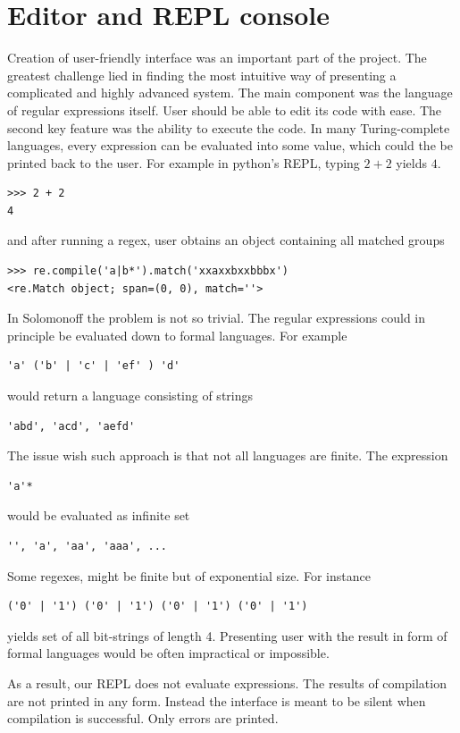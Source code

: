 
\section{Editor and REPL console}

Creation of user-friendly interface was an important part of the project.
The greatest challenge lied in finding the most intuitive way of presenting a complicated and highly advanced system. The main component was the language of regular expressions itself. User should be able to edit its code with ease. The second key feature was the ability to execute the code. 
In many Turing-complete languages, every expression can be evaluated into some value, which could the be printed back to the user. For example in python's REPL, typing $2+2$ yields $4$.
\begin{lstlisting}
>>> 2 + 2
4
\end{lstlisting}
and after running a regex, user obtains an object containing all matched groups
\begin{lstlisting}
>>> re.compile('a|b*').match('xxaxxbxxbbbx')
<re.Match object; span=(0, 0), match=''>
\end{lstlisting}
In Solomonoff the problem is not so trivial. The regular expressions could in principle be evaluated down to formal languages. For example 
\begin{lstlisting}
'a' ('b' | 'c' | 'ef' ) 'd'
\end{lstlisting}
would return a language consisting of strings
\begin{lstlisting}
'abd', 'acd', 'aefd'
\end{lstlisting}
The issue wish such approach is that not all languages are finite. The expression
\begin{lstlisting}
'a'*
\end{lstlisting}
would be evaluated as infinite set
\begin{lstlisting}
'', 'a', 'aa', 'aaa', ...
\end{lstlisting}
Some regexes, might be finite but of exponential size. For instance
\begin{lstlisting}
('0' | '1') ('0' | '1') ('0' | '1') ('0' | '1')
\end{lstlisting}
yields set of all bit-strings of length 4. Presenting user with the result in form of formal languages would be often impractical or impossible. 

As a result, our REPL does not evaluate expressions. The results of compilation are not printed in any form. Instead the interface is meant to be silent when compilation is successful. Only errors are printed. 

